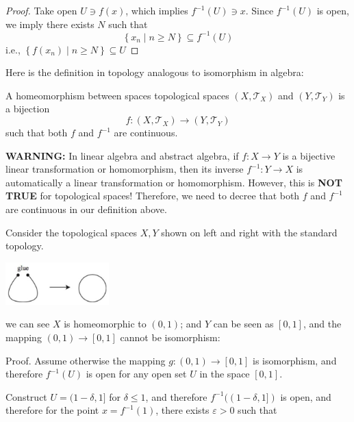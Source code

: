 \begin{example}
\begin{proof} Take open \(U \ni  f\left(x\right)\), which implies \({f}^{-1}\left(U\right)  \ni  x\). Since \({f}^{-1}\left(U\right)\) is open, we imply there exists \(N\) such that
\[
\left\{  {x_n \mid  n \geq  N}\right\}   \subseteq  {f}^{-1}\left(U\right)
\]
i.e., \(\left\{  {f\left(x_n\right)  \mid  n \geq  N}\right\}   \subseteq  U\)
\end{proof}

Here is the definition in topology analogous to isomorphism in algebra:
\begin{definition}[Homeomorphism] A homeomorphism between spaces topological spaces \(\left({X,{\mathcal{T}}_X}\right)\) and \(\left({Y,{\mathcal{T}}_Y}\right)\) is a bijection
\[
f : \left({X,{\mathcal{T}}_X}\right)  \rightarrow  \left({Y,{\mathcal{T}}_Y}\right)
\]
such that both \(f\) and \({f}^{-1}\) are continuous.
\end{definition}

{\bf WARNING:} In linear algebra and abstract algebra, if $f: X \to Y$ is a bijective linear transformation or homomorphism, then its inverse $f^{-1}: Y \to X$ is automatically a linear transformation or homomorphism. However, this is {\bf NOT TRUE} for topological spaces! Therefore, we need to decree that both $f$ and $f^{-1}$ are continuous in our definition above.

\begin{example}
    Consider the topological spaces
\(X,Y\) shown on left and right with the standard topology. 
\begin{center}
\includegraphics[width=0.3\textwidth]{images/Ch2_not_homeo.jpg}
\end{center}
we can see $X$ is homeomorphic to $(0,1)$; and $Y$ can be seen as \(\left\lbrack  {0,1}\right\rbrack\), and the mapping \(\left({0,1}\right)  \rightarrow  \left\lbrack  {0,1}\right\rbrack\) cannot be isomorphism:

Proof. Assume otherwise the mapping \(g : \left({0,1}\right)  \rightarrow  \left\lbrack  {0,1}\right\rbrack\) is isomorphism, and therefore \({f}^{-1}\left(U\right)\) is open for any open set \(U\) in the space \(\left\lbrack  {0,1}\right\rbrack\).

Construct \(U = (1 - \delta,1\rbrack\) for \(\delta  \leq  1\), and therefore \({f}^{-1}(\left({1 - \delta,1\rbrack}\right)\) is open, and therefore for the point \(x = {f}^{-1}\left(1\right)\), there exists \(\varepsilon  > 0\) such that


\end{example}
\end{example}
